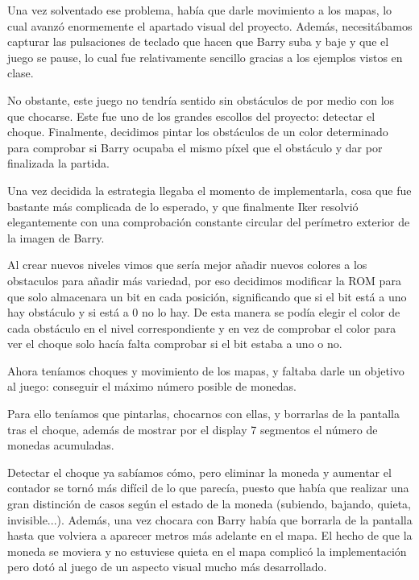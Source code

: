 \documentclass[11pt, a4paper, spanish, openright, twoside]{book}
\begin{document}
Una vez solventado ese problema, había que darle movimiento a los mapas, lo cual avanzó enormemente el apartado visual del proyecto.
Además, necesitábamos capturar las pulsaciones de teclado que hacen que Barry suba y baje y que el juego se pause, lo cual fue relativamente sencillo gracias a los ejemplos vistos en clase.


No obstante, este juego no tendría sentido sin obstáculos de por medio con los que chocarse.
Este fue uno de los grandes escollos del proyecto: detectar el choque.
Finalmente, decidimos pintar los obstáculos de un color determinado para comprobar si Barry ocupaba el mismo píxel que el obstáculo y dar por finalizada la partida.

Una vez decidida la estrategia llegaba el momento de implementarla, cosa que fue bastante más complicada de lo esperado, y que finalmente Iker resolvió elegantemente con una comprobación constante circular del perímetro exterior de la imagen de Barry.


Al crear nuevos niveles vimos que sería mejor añadir nuevos colores a los obstaculos para añadir más variedad, por eso decidimos modificar la ROM para que solo almacenara un bit en cada posición, significando que si el bit está a uno hay obstáculo y si está a 0 no lo hay. De esta manera se podía elegir el color de cada obstáculo en el nivel correspondiente y en vez de comprobar el color para ver el choque solo hacía falta comprobar si el bit estaba a uno o no. 


Ahora teníamos choques y movimiento de los mapas, y faltaba darle un objetivo al juego: conseguir el máximo número posible de monedas.

Para ello teníamos que pintarlas, chocarnos con ellas, y borrarlas de la pantalla tras el choque, además de mostrar por el display 7 segmentos el número de monedas acumuladas.

Detectar el choque ya sabíamos cómo, pero eliminar la moneda y aumentar el contador se tornó más difícil de lo que parecía, puesto que había que realizar una gran distinción de casos según el estado de la moneda (subiendo, bajando, quieta, invisible...). Además, una vez chocara con Barry había que borrarla de la pantalla hasta que volviera a aparecer metros más adelante en el mapa. El hecho de que la moneda se moviera y no estuviese quieta en el mapa complicó la implementación pero dotó al juego de un aspecto visual mucho más desarrollado.
\end{document}

